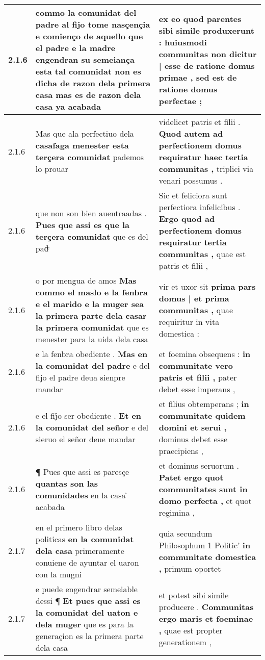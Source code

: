 \begin{tabular}{|p{1cm}|p{6.5cm}|p{6.5cm}|}
2.1.6 & commo la comunidat del padre al fijo tome nasçençia e comienço de aquello que el padre e la madre \textbf{ engendran su semeiança esta tal comunidat non es dicha de razon dela primera casa } mas es de razon dela casa ya acabada & ex eo quod parentes sibi simile produxerunt : \textbf{ huiusmodi communitas non dicitur | esse de ratione domus primae , } sed est de ratione domus perfectae ; \\\hline
2.1.6 & Mas que ala perfectiuo dela \textbf{ casafaga menester esta terçera comunidat } pademos lo prouar & videlicet patris et filii . \textbf{ Quod autem ad perfectionem domus requiratur haec tertia communitas , } triplici via venari possumus . \\\hline
2.1.6 & que non son bien auentraadas . \textbf{ Pues que assi es que la terçera comunidat } que es del padͤ & Sic et feliciora sunt perfectiora infelicibus . \textbf{ Ergo quod ad perfectionem domus requiratur tertia communitas , } quae est patris et filii , \\\hline
2.1.6 & o por mengua de amos \textbf{ Mas commo el maslo e la fenbra e el marido e la muger sea la primera parte dela casar la primera comunidat } que es menester para la uida dela casa & vir et uxor sit \textbf{ prima pars domus | et prima communitas , } quae requiritur in vita domestica : \\\hline
2.1.6 & e la fenbra obediente . \textbf{ Mas en la comunidat del padre } e del fijo el padre deua sienpre mandar & et foemina obsequens : \textbf{ in communitate vero patris et filii , } pater debet esse imperans , \\\hline
2.1.6 & e el fij̉o ser obediente . \textbf{ Et en la comunidat del señor } e del sieruo el señor deue mandar & et filius obtemperans ; \textbf{ in communitate quidem domini et serui , } dominus debet esse praecipiens , \\\hline
2.1.6 & ¶ Pues que assi es paresçe \textbf{ quantas son las comunidades } en la casa ̀ acabada & et dominus seruorum . \textbf{ Patet ergo quot communitates sunt in domo perfecta , } et quot regimina , \\\hline
2.1.7 & en el primero libro delas politicas \textbf{ en la comunidat dela casa } primeramente conuiene de ayuntar el uaron con la mugni & quia secundum Philosophum 1 Politic’ \textbf{ in communitate domestica , } primum oportet \\\hline
2.1.7 & e puede engendrar semeiable dessi ¶ \textbf{ Et pues que assi es la comunidat del uaton e dela muger } que es para la generaçion es la primera parte dela casa & et potest sibi simile producere . \textbf{ Communitas ergo maris et foeminae , } quae est propter generationem , \\\hline

\end{tabular}
